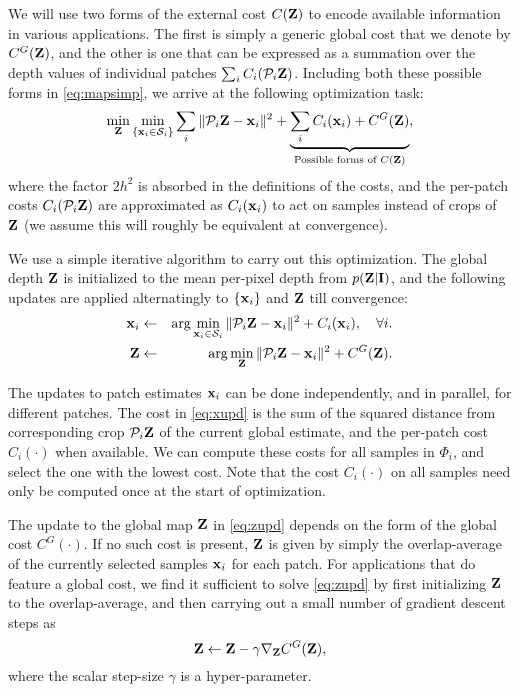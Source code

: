 \documentclass[10pt,twocolumn,letterpaper]{article}
\begin{document}
We will use two forms of the external cost $C(\mathbf{Z})$ to encode available information in various applications. The first is simply a generic global cost that we denote by $C^G(\mathbf{Z})$, and the other is one that can be expressed as a summation over the depth values of individual patches $\sum_i C_i(\mathcal{P}_i{}\mathbf{Z})$. Including both these possible forms in \eqref{eq:mapsimp}, we arrive at the following optimization task:
\begin{equation}
  \label{eq:genopt}
  \min_{\mathbf{Z}} \min_{\{\mathbf{x}{}_i\in\mathcal{S}_i\}} \sum_i \|\mathcal{P}_i{}\mathbf{Z} - \mathbf{x}{}_i\|^2+ \underbrace{\sum_i C_i(\mathbf{x}{}_i) + C^G(\mathbf{Z})}_{\text{Possible forms of } C(\mathbf{Z})},
\end{equation}
where the factor $2h^2$ is absorbed in the definitions of the costs, and the per-patch costs $C_i(\mathcal{P}_i{}\mathbf{Z})$ are approximated as $C_i(\mathbf{x}{}_i)$ to act on samples instead of crops of $\mathbf{Z}$ (we assume this will roughly be equivalent at convergence).

We use a simple iterative algorithm to carry out this optimization. The global depth $\mathbf{Z}$ is initialized to the mean per-pixel depth from $p(\mathbf{Z}|\mathbf{I})$, and the following updates are applied alternatingly to $\{\mathbf{x}{}_i\}$ and $\mathbf{Z}$ till convergence:
\begin{eqnarray}
  \mathbf{x}{}_i &\leftarrow& \arg \min_{\mathbf{x}{}_i \in \mathcal{S}_i} \|\mathcal{P}_i{}\mathbf{Z} - \mathbf{x}{}_i\|^2 + C_i(\mathbf{x}{}_i),~~~\forall i.\label{eq:xupd}\\
  \mathbf{Z} &\leftarrow& \arg \min_{\mathbf{Z}} \|\mathcal{P}_i{}\mathbf{Z} - \mathbf{x}{}_i\|^2 + C^G(\mathbf{Z}).\label{eq:zupd}
\end{eqnarray}


The updates to patch estimates $\mathbf{x}{}_i$ can be done independently, and in parallel, for different patches. The cost in \eqref{eq:xupd} is the sum of the squared distance from corresponding crop  $\mathcal{P}_i{}\mathbf{Z}$ of the current global estimate, and the per-patch cost $C_i(\cdot)$ when available. We can compute these costs for all samples in $\Phi_i$, and select the one with the lowest cost. Note that the cost $C_i(\cdot)$ on all samples need only be computed once at the start of optimization.

The update to the global map $\mathbf{Z}$ in \eqref{eq:zupd} depends on the form of the global cost $C^G(\cdot)$. If no such cost is present, $\mathbf{Z}$ is given by simply the overlap-average of the currently selected samples $\mathbf{x}{}_i$ for each patch. For applications that do feature a global cost, we find it sufficient to solve \eqref{eq:zupd} by first initializing $\mathbf{Z}$ to the overlap-average, and then carrying out a small number of gradient descent steps as
\begin{equation}
  \label{eq:gradzupd}
  \mathbf{Z} \leftarrow \mathbf{Z} - \gamma \nabla_{\mathbf{Z}} C^G(\mathbf{Z}),
\end{equation}
where the scalar step-size $\gamma$ is a hyper-parameter.
\end{document}
